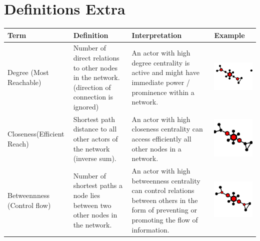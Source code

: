 \documentclass[a4paper,landscape,12pt]{scrreprt}
\begin{document}
\section{Definitions Extra} %
\label{sec:definitions_extra}
\begin{tabular}{|p{7cm}|p{7cm}|p{7cm}|p{4cm}|}
\hline
\textbf{Term} & \textbf{Definition} & \textbf{Interpretation} & \textbf{Example} \\ \hline
Degree (Most Reachable) & Number of direct relations
to other nodes in the
network. (direction of
connection is ignored) & An actor with high degree
centrality is active and
might have immediate
power / prominence within
a network. & \vspace{0cm}\includegraphics[scale=0.4]{./img/degeg.png}\\ \hline
Closeness(Efficient Reach) & Shortest path distance to
all other actors of the
network (inverse sum).& An actor with high
closeness centrality can
access efficiently all other
nodes in a network.
& \vspace{0cm} \includegraphics[scale=0.4]{./img/cleg.png} \\ \hline
Betweennness (Control flow) & Number of shortest paths
a node lies between two
other nodes in the
network.& An actor with high
betweenness centrality
can control relations
between others in the form
of preventing or promoting
the flow of information.
&\vspace{0cm} \includegraphics[scale=0.4]{./img/bteg.png} \\ \hline

\end{tabular}
\end{document}
